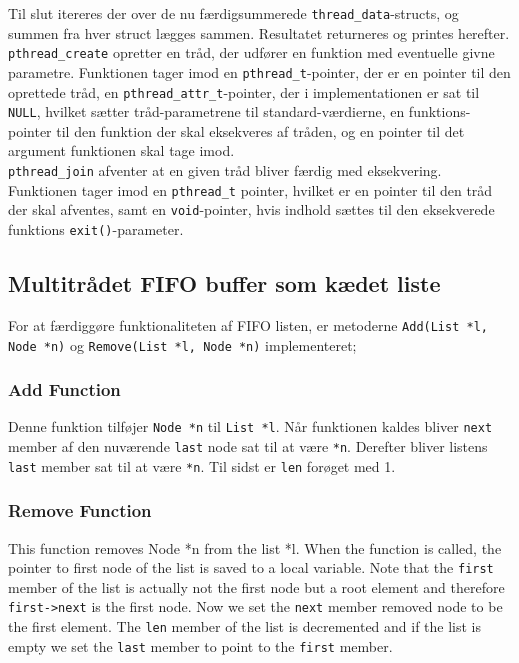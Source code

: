Til slut itereres der over de nu færdigsummerede \texttt{thread\_data}-structs, og summen fra hver struct lægges sammen. Resultatet returneres og printes herefter. \\ 

\texttt{pthread\_create} opretter en tråd, der udfører en funktion med eventuelle givne parametre. 
Funktionen tager imod en \texttt{pthread\_t}-pointer, der er en pointer til den oprettede tråd, en \texttt{pthread\_attr\_t}-pointer, der i implementationen er sat til \texttt{NULL}, hvilket sætter tråd-parametrene til standard-værdierne, en funktions-pointer til den funktion der skal eksekveres af tråden, og en pointer til det argument funktionen skal tage imod. \\

\texttt{pthread\_join} afventer at en given tråd bliver færdig med eksekvering. 
Funktionen tager imod en \texttt{pthread\_t} pointer, hvilket er en pointer til den tråd der skal afventes, samt en \texttt{void}-pointer, hvis indhold sættes til den eksekverede funktions \texttt{exit()}-parameter.\\

\subsection{Multitrådet FIFO buffer som kædet liste}
\label{list.c}
For at færdiggøre funktionaliteten af FIFO listen, er metoderne \texttt{Add(List *l, Node *n)} og \texttt{Remove(List *l, Node *n)} implementeret;

\subsubsection{Add Function}
Denne funktion tilføjer \texttt{Node *n} til \texttt{List *l}. Når funktionen kaldes bliver \texttt{next} member af den nuværende \texttt{last} node sat til at være \texttt{*n}. Derefter bliver listens \texttt{last} member sat til at være \texttt{*n}. Til sidst er \texttt{len} forøget med 1.

\subsubsection{Remove Function}

This function removes Node *n from the list *l. When the function is called, the pointer to first node of the list is saved to a local variable. Note that the \texttt{first} member of the list is actually not the first node but a root element and therefore \texttt{first->next} is the first node. Now we set the \texttt{next} member removed node to be the first element. The \texttt{len} member of the list is decremented and if the list is empty we set the \texttt{last} member to point to the \texttt{first} member.\\

